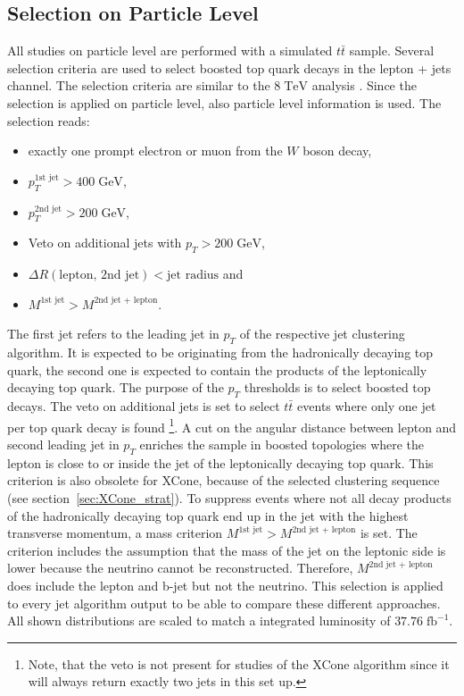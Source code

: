 \subsection{Selection on Particle Level}
\label{sec:GenSel}
	All studies on particle level are performed with a simulated $t\bar{t}$ sample. Several selection criteria are used to select boosted top quark decays in the lepton + jets channel. The selection criteria are similar to the $8\;\text{TeV}$ analysis \cite{torben_paper}. Since the selection is applied on particle level, also particle level information is used. The selection reads:
	\begin{itemize}
	\item exactly one prompt electron or muon from the $W$ boson decay,
	\item $p_T^{\text{1st jet}} > 400\;\text{GeV}$,
	\item $p_T^{\text{2nd jet}} > 200\;\text{GeV}$,
	\item Veto on additional jets with $p_T > 200\;\text{GeV}$,
	\item $\Delta R (\text{lepton, 2nd jet}) < \text{jet radius}$ and
	\item $M^{\text{1st jet}} > M^{\text{2nd jet + lepton}}$.
	\end{itemize}
	The first jet refers to the leading jet in $p_T$ of the respective jet clustering algorithm. It is expected to be originating from the hadronically decaying top quark, the second one is expected to contain the products of the leptonically decaying top quark. The purpose of the $p_T$ thresholds is to select boosted top decays. The veto on additional jets is set to select $t\bar{t}$ events where only one jet per top quark decay is found \footnote{Note, that the veto is not present for studies of the XCone algorithm since it will always return exactly two jets in this set up.}. A cut on the angular distance between lepton and second leading jet in $p_T$ enriches the sample in boosted topologies where the lepton is close to or inside the jet of the leptonically decaying top quark. This criterion is also obsolete for XCone, because of the selected clustering sequence (see section~\ref{sec:XCone_strat}). To suppress events where not all decay products of the hadronically decaying top quark end up in the jet with the highest transverse momentum, a mass criterion $M^{\text{1st jet}} > M^{\text{2nd jet + lepton}}$ is set. The criterion includes the assumption that the mass of the jet on the leptonic side is lower because the neutrino cannot be reconstructed. Therefore, $M^{\text{2nd jet + lepton}}$ does include the lepton and b-jet but not the neutrino. This selection is applied to every jet algorithm output to be able to compare these different approaches. All shown distributions are scaled to match a integrated luminosity of $37.76\;\text{fb}^{-1}$.

